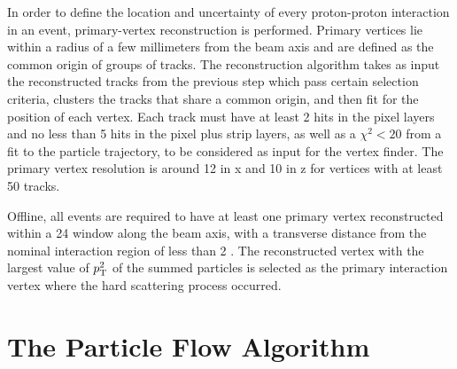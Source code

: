 In order to define the location and uncertainty of every proton-proton interaction in an event, primary-vertex reconstruction is performed. Primary vertices lie within a radius of a few millimeters from the beam axis and are defined as the common origin of groups of tracks.
The reconstruction algorithm takes as input the reconstructed tracks from the previous step which pass certain selection criteria, clusters the tracks that share a common origin, and then fit for the position of each vertex. Each track must have at least 2 hits in the pixel layers and no less than 5 hits in the pixel plus strip layers, as well as a $\chi^2<20$ from a fit to the particle trajectory, to be considered as input for the vertex finder. The primary vertex resolution is around 12 \micron in x and 10 \micron in z for vertices with at least 50 tracks.

Offline, all events are required to have at least one primary vertex reconstructed within a 24 \cm window along the beam axis, with a transverse distance from the nominal interaction region of less than 2 \cm. The reconstructed vertex with the largest value of $p_{\mathrm{T}}^2$ of the summed particles is selected as the primary interaction vertex where the hard scattering process occurred.
\clearpage
\section{The Particle Flow Algorithm}

